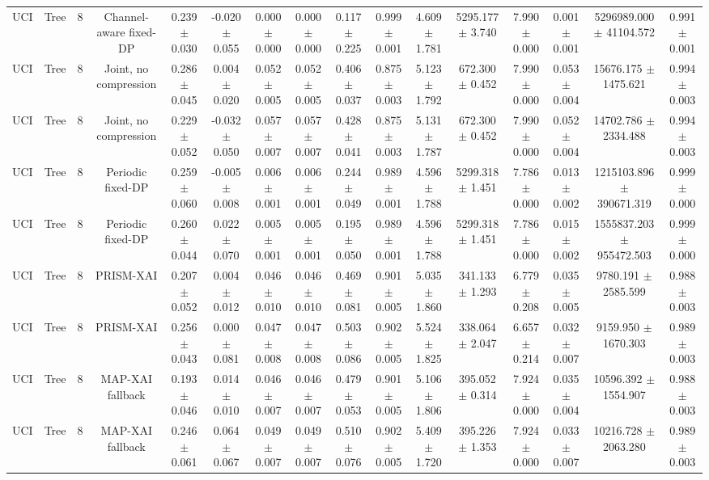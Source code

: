 \begin{tabular}{lccccccccccccccc}
UCI & Tree & 8 & Channel-aware fixed-DP & 0.239 $\pm$ 0.030 & -0.020 $\pm$ 0.055 & 0.000 $\pm$ 0.000 & 0.000 $\pm$ 0.000 & 0.117 $\pm$ 0.225 & 0.999 $\pm$ 0.001 & 4.609 $\pm$ 1.781 & 5295.177 $\pm$ 3.740 & 7.990 $\pm$ 0.000 & 0.001 $\pm$ 0.001 & 5296989.000 $\pm$ 41104.572 & 0.991 $\pm$ 0.001 \\
UCI & Tree & 8 & Joint, no compression & 0.286 $\pm$ 0.045 & 0.004 $\pm$ 0.020 & 0.052 $\pm$ 0.005 & 0.052 $\pm$ 0.005 & 0.406 $\pm$ 0.037 & 0.875 $\pm$ 0.003 & 5.123 $\pm$ 1.792 & 672.300 $\pm$ 0.452 & 7.990 $\pm$ 0.000 & 0.053 $\pm$ 0.004 & 15676.175 $\pm$ 1475.621 & 0.994 $\pm$ 0.003 \\
UCI & Tree & 8 & Joint, no compression & 0.229 $\pm$ 0.052 & -0.032 $\pm$ 0.050 & 0.057 $\pm$ 0.007 & 0.057 $\pm$ 0.007 & 0.428 $\pm$ 0.041 & 0.875 $\pm$ 0.003 & 5.131 $\pm$ 1.787 & 672.300 $\pm$ 0.452 & 7.990 $\pm$ 0.000 & 0.052 $\pm$ 0.004 & 14702.786 $\pm$ 2334.488 & 0.994 $\pm$ 0.003 \\
UCI & Tree & 8 & Periodic fixed-DP & 0.259 $\pm$ 0.060 & -0.005 $\pm$ 0.008 & 0.006 $\pm$ 0.001 & 0.006 $\pm$ 0.001 & 0.244 $\pm$ 0.049 & 0.989 $\pm$ 0.001 & 4.596 $\pm$ 1.788 & 5299.318 $\pm$ 1.451 & 7.786 $\pm$ 0.000 & 0.013 $\pm$ 0.002 & 1215103.896 $\pm$ 390671.319 & 0.999 $\pm$ 0.000 \\
UCI & Tree & 8 & Periodic fixed-DP & 0.260 $\pm$ 0.044 & 0.022 $\pm$ 0.070 & 0.005 $\pm$ 0.001 & 0.005 $\pm$ 0.001 & 0.195 $\pm$ 0.050 & 0.989 $\pm$ 0.001 & 4.596 $\pm$ 1.788 & 5299.318 $\pm$ 1.451 & 7.786 $\pm$ 0.000 & 0.015 $\pm$ 0.002 & 1555837.203 $\pm$ 955472.503 & 0.999 $\pm$ 0.000 \\
UCI & Tree & 8 & PRISM-XAI & 0.207 $\pm$ 0.052 & 0.004 $\pm$ 0.012 & 0.046 $\pm$ 0.010 & 0.046 $\pm$ 0.010 & 0.469 $\pm$ 0.081 & 0.901 $\pm$ 0.005 & 5.035 $\pm$ 1.860 & 341.133 $\pm$ 1.293 & 6.779 $\pm$ 0.208 & 0.035 $\pm$ 0.005 & 9780.191 $\pm$ 2585.599 & 0.988 $\pm$ 0.003 \\
UCI & Tree & 8 & PRISM-XAI & 0.256 $\pm$ 0.043 & 0.000 $\pm$ 0.081 & 0.047 $\pm$ 0.008 & 0.047 $\pm$ 0.008 & 0.503 $\pm$ 0.086 & 0.902 $\pm$ 0.005 & 5.524 $\pm$ 1.825 & 338.064 $\pm$ 2.047 & 6.657 $\pm$ 0.214 & 0.032 $\pm$ 0.007 & 9159.950 $\pm$ 1670.303 & 0.989 $\pm$ 0.003 \\
UCI & Tree & 8 & MAP-XAI fallback & 0.193 $\pm$ 0.046 & 0.014 $\pm$ 0.010 & 0.046 $\pm$ 0.007 & 0.046 $\pm$ 0.007 & 0.479 $\pm$ 0.053 & 0.901 $\pm$ 0.005 & 5.106 $\pm$ 1.806 & 395.052 $\pm$ 0.314 & 7.924 $\pm$ 0.000 & 0.035 $\pm$ 0.004 & 10596.392 $\pm$ 1554.907 & 0.988 $\pm$ 0.003 \\
UCI & Tree & 8 & MAP-XAI fallback & 0.246 $\pm$ 0.061 & 0.064 $\pm$ 0.067 & 0.049 $\pm$ 0.007 & 0.049 $\pm$ 0.007 & 0.510 $\pm$ 0.076 & 0.902 $\pm$ 0.005 & 5.409 $\pm$ 1.720 & 395.226 $\pm$ 1.353 & 7.924 $\pm$ 0.000 & 0.033 $\pm$ 0.007 & 10216.728 $\pm$ 2063.280 & 0.989 $\pm$ 0.003 \\
\bottomrule
\end{tabular}

